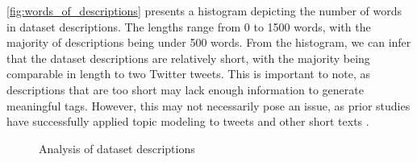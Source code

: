 
\cref{fig:words_of_descriptions} presents a histogram depicting the number of words in dataset descriptions. The lengths range from 0 to 1500 words, with the majority of descriptions being under 500 words. From the histogram, we can infer that the dataset descriptions are relatively short, with the majority being comparable in length to two Twitter tweets. This is important to note, as descriptions that are too short may lack enough information to generate meaningful tags. However, this may not necessarily pose an issue, as prior studies have successfully applied topic modeling to tweets and other short texts \cite{cataldi_emerging_2010, churchill_percolation-based_2020, curiskis_evaluation_2020, kasiviswanathan_emerging_2011, paul_discovering_2014, yin_dirichlet_2014}.


\begin{figure}[h]
    \centering
    \hfill
    \caption{Analysis of dataset descriptions}
    \label{fig:dataset_description_histograms}
\end{figure}

